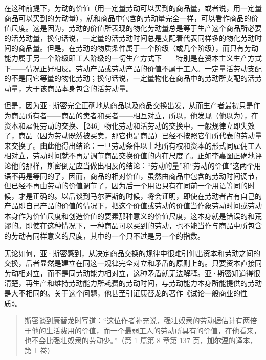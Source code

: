 在这种前提下，劳动的价值（用一定量劳动可以买到的商品量，或者说，用一定量商品可以买到的劳动量），就和商品中包含的劳动量完全一样，可以看作商品的价值尺度。这是因为，劳动的价值所表现的物化劳动量总是等于生产这个商品所必要的活劳动量，换句话说，一定量的活劳动时间总是支配着代表同样多的物化劳动时间的商品量。但是，在劳动的物质条件属于一个阶级（或几个阶级），而只有劳动能力属于另一个阶级即工人阶级的一切生产方式下——特别是在资本主义生产方式下——情况正好相反。劳动产品或劳动产品的价值不属于工人。一定量活劳动支配的不是同它等量的物化劳动；换句话说，一定量物化在商品中的劳动所支配的活劳动量，大于该商品本身包含的活劳动量。

但是，因为亚·斯密完全正确地从商品以及商品交换出发，从而生产者最初只是作为商品所有者——商品的卖者和买者——相互对立，所以，他发现（他以为），在资本和雇佣劳动的交换、［246］物化劳动和活劳动的交换中，一般规律立即失效了，商品（因为劳动既然被买卖，那它也是商品）已经不按照它们所代表的劳动量来交换了。\textbf{由此}他得出结论：一旦劳动条件以土地所有权和资本的形式同雇佣工人相对立，劳动时间就不再是调节商品交换价值的内在尺度了。正如李嘉图正确地评论他的那样，斯密倒是应当做出相反的结论：“劳动的量”和“劳动的价值”这两个用语不再是等同的了，因而，商品的相对价值，虽然由商品中包含的劳动时间调节，但已经不再由劳动的价值调节了，因为后一个用语只有在同前一个用语等同的时候，才是正确的。以后谈到马尔萨斯的时候，将会证明，即使在劳动者占有自己的产品即自己产品的价值的情况下，把这个价值或劳动的价值当作象劳动时间或劳动本身作为价值尺度和创造价值的要素那种意义的价值尺度，这本身就是错误的和荒谬的。即使在这种情况下，一种商品可以买到的劳动，也不能当作与商品中所包含的劳动有同样意义的尺度，其中的一个只不过是另一个的指数。

无论如何，亚·斯密感到，从决定商品交换的规律中很难引伸出资本和劳动之间的交换，后者显然是建立在同这一规律完全对立和矛盾的原则上的。只要资本直接同劳动相对立，而不是同劳动能力相对立，这种矛盾就无法解释。亚·斯密知道得很清楚，再生产和维持劳动能力所耗费的劳动时间，与劳动能力本身所能提供的劳动是大不相同的。关于这个问题，他甚至引证康替龙的著作《试论一般商业的性质》。

\begin{quote}斯密谈到康替龙时写道：“这位作者补充说，强壮奴隶的劳动据估计有两倍于他的生活费用的价值，而一个最弱工人的劳动所具有的价值，在他看来，也不会比强壮奴隶的劳动少。”（第 1 篇第 8 章第 137 页，\textbf{加尔涅}的译本，第 1 卷）\end{quote}

